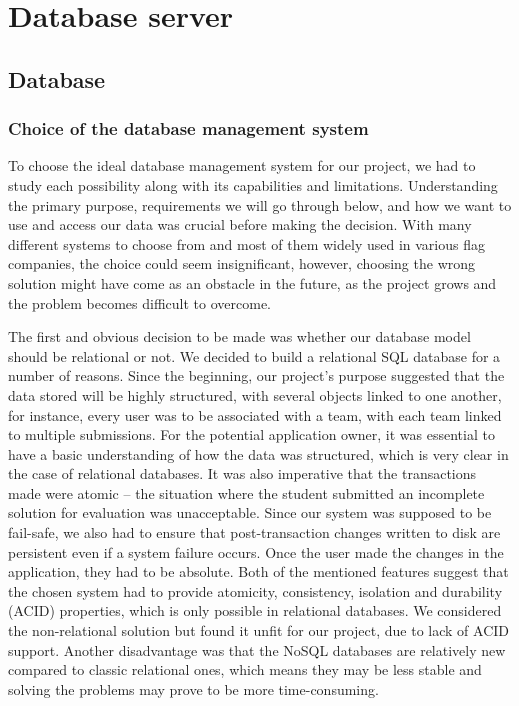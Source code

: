 \chapter{Database server}
\label{chap:database}

\section{Database} %
\subsection{Choice of the database management system}
To choose the ideal database management system for our project, we had to study each possibility along with its capabilities and limitations.  Understanding the primary purpose, requirements we will go through below, and how we want to use and access our data was crucial before making the decision. With many different systems to choose from and most of them widely used in various flag companies, the choice could seem insignificant, however, choosing the wrong solution might have come as an obstacle in the future, as the project grows and the problem becomes difficult to overcome.

The first and obvious decision to be made was whether our database model should be relational or not. We decided to build a relational SQL database for a number of reasons. Since the beginning, our project's purpose suggested that the data stored will be highly structured, with several objects linked to one another, for instance, every user was to be associated with a team, with each team linked to multiple submissions. For the potential application owner, it was essential to have a basic understanding of how the data was structured, which is very clear in the case of relational databases. It was also imperative that the transactions made were atomic -- the situation where the student submitted an incomplete solution for evaluation was unacceptable. Since our system was supposed to be fail-safe, we also had to ensure that post-transaction changes written to disk are persistent even if a system failure occurs. Once the user made the changes in the application, they had to be absolute. Both of the mentioned features suggest that the chosen system had to provide atomicity, consistency, isolation and durability (ACID) properties, which is only possible in relational databases. We considered the non-relational solution but found it unfit for our project, due to lack of ACID support. Another disadvantage was that the NoSQL databases are relatively new compared to classic relational ones, which means they may be less stable and solving the problems may prove to be more time-consuming.

